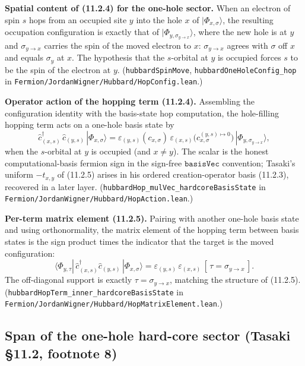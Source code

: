 \documentclass[a4paper,11pt]{article}
\begin{document}
\medskip
\noindent\textbf{Spatial content of (11.2.4) for the one-hole sector.}
When an electron of spin \(s\) hops from an occupied site \(y\) into the hole
\(x\) of \(|\Phi_{x,\sigma}\rangle\), the resulting occupation configuration is
exactly that of \(|\Phi_{y,\sigma_{y\to x}}\rangle\), where the new hole is at
\(y\) and \(\sigma_{y\to x}\) carries the spin of the moved electron to \(x\):
\(\sigma_{y\to x}\) agrees with \(\sigma\) off \(x\) and equals \(\sigma_y\) at
\(x\). The hypothesis that the \(s\)-orbital at \(y\) is occupied forces \(s\)
to be the spin of the electron at \(y\). (\texttt{hubbardSpinMove},
\texttt{hubbardOneHoleConfig\_hop} in
\texttt{Fermion/JordanWigner/Hubbard/HopConfig.lean}.)

\medskip
\noindent\textbf{Operator action of the hopping term (11.2.4).}
Assembling the configuration identity with the basis-state hop computation, the
hole-filling hopping term acts on a one-hole basis state by
\[
  \hat c^\dagger_{(x,s)}\,\hat c_{(y,s)}\,|\Phi_{x,\sigma}\rangle
    = \varepsilon_{(y,s)}(c_{x,\sigma})\,
      \varepsilon_{(x,s)}\!\bigl(c_{x,\sigma}^{(y,s)\mapsto0}\bigr)\,
      |\Phi_{y,\sigma_{y\to x}}\rangle,
\]
when the \(s\)-orbital at \(y\) is occupied (and \(x\neq y\)). The scalar is the
honest computational-basis fermion sign in the sign-free \(\mathtt{basisVec}\)
convention; Tasaki's uniform \(-t_{x,y}\) of (11.2.5) arises in his ordered
creation-operator basis (11.2.3), recovered in a later layer.
(\texttt{hubbardHop\_mulVec\_hardcoreBasisState} in
\texttt{Fermion/JordanWigner/Hubbard/HopAction.lean}.)

\medskip
\noindent\textbf{Per-term matrix element (11.2.5).}
Pairing with another one-hole basis state and using orthonormality, the matrix
element of the hopping term between basis states is the sign product times the
indicator that the target is the moved configuration:
\[
  \langle \Phi_{y,\tau} |\, \hat c^\dagger_{(x,s)}\hat c_{(y,s)}\,|
    \Phi_{x,\sigma}\rangle
    = \varepsilon_{(y,s)}\,\varepsilon_{(x,s)}\,
      [\,\tau = \sigma_{y\to x}\,].
\]
The off-diagonal support is exactly \(\tau = \sigma_{y\to x}\), matching the
structure of (11.2.5). (\texttt{hubbardHopTerm\_inner\_hardcoreBasisState} in
\texttt{Fermion/JordanWigner/Hubbard/HopMatrixElement.lean}.)

\subsection{Span of the one-hole hard-core sector (Tasaki §11.2, footnote 8)}
\label{subsec:hubbard-hardcore-span}
\end{document}
